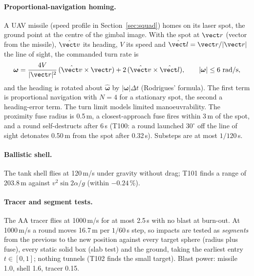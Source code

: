 \paragraph{Proportional-navigation homing.} A UAV missile (speed profile in Section~\ref{sec:squad}) homes on its laser spot, the ground point at the centre of the gimbal image. With the spot at
$\vect r$ (vector from the missile), $\hat{\vect v}$ its heading, $V$ its speed and $\hat{\vect l}=\vect r/|\vect r|$ the line of sight,
the commanded turn rate is
\begin{equation}
  \boldsymbol\omega=\frac{4V}{|\vect r|^2}\,(\hat{\vect v}\times\vect r)+2\,(\hat{\vect v}\times\hat{\vect l}),\qquad |\boldsymbol\omega|\le6\ \text{rad/s},
\end{equation}
and the heading is rotated about $\hat{\boldsymbol\omega}$ by $|\boldsymbol\omega|\Delta t$ (Rodrigues' formula). The first term is proportional navigation with $N=4$ for a
stationary spot, the second a heading-error term. The turn limit models limited manoeuvrability. The proximity fuse radius is 0.5\,m, a closest-approach
fuse fires within 3\,m of the spot, and a round self-destructs after 6\,s (T100: a round launched
$30^\circ$ off the line of sight detonates 0.50\,m from the spot after 0.32\,s). Substeps are at most $1/120$\,s.

\paragraph{Ballistic shell.} The tank shell flies at 120\,m/s under gravity without drag; T101 finds a range of 203.8\,m against
$v^2\sin2\alpha/g$ (within $-0.24$\,\%).

\paragraph{Tracer and segment tests.} The AA tracer flies at 1000\,m/s for at most 2.5\,s with no blast at burn-out. At 1000\,m/s a round moves 16.7\,m per
$1/60$\,s step, so impacts are tested as \emph{segments} from the previous to the new position against every target sphere (radius plus fuse), every static solid box
(slab test) and the ground, taking the earliest entry $t\in[0,1]$; nothing tunnels (T102 finds the small target). Blast power: missile 1.0, shell 1.6, tracer 0.15.


